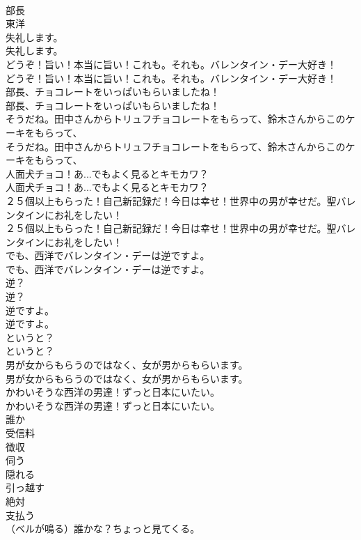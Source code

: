 \documentclass[8pt]{extreport}
\begin{document}
\begin{CJK}{UTF8}{min}
\\	部長
\\	東洋
\\	失礼します。	
\\	失礼します。 
\\	どうぞ！旨い！本当に旨い！これも。それも。バレンタイン・デー大好き！	
\\	どうぞ！旨い！本当に旨い！これも。それも。バレンタイン・デー大好き！ 
\\	部長、チョコレートをいっぱいもらいましたね！	
\\	部長、チョコレートをいっぱいもらいましたね！ 
\\	そうだね。田中さんからトリュフチョコレートをもらって、鈴木さんからこのケーキをもらって、	
\\	そうだね。田中さんからトリュフチョコレートをもらって、鈴木さんからこのケーキをもらって、 
\\	人面犬チョコ！あ...でもよく見るとキモカワ？	
\\	人面犬チョコ！あ...でもよく見るとキモカワ？ 
\\	２５個以上もらった！自己新記録だ！今日は幸せ！世界中の男が幸せだ。聖バレンタインにお礼をしたい！	
\\	２５個以上もらった！自己新記録だ！今日は幸せ！世界中の男が幸せだ。聖バレンタインにお礼をしたい！ 
\\	でも、西洋でバレンタイン・デーは逆ですよ。	
\\	でも、西洋でバレンタイン・デーは逆ですよ。 
\\	逆？	
\\	逆？ 
\\	逆ですよ。	
\\	逆ですよ。 
\\	というと？	
\\	というと？ 
\\	男が女からもらうのではなく、女が男からもらいます。	
\\	男が女からもらうのではなく、女が男からもらいます。 
\\	かわいそうな西洋の男達！ずっと日本にいたい。	
\\	かわいそうな西洋の男達！ずっと日本にいたい。 
\\	誰か
\\	受信料
\\	徴収
\\	伺う
\\	隠れる
\\	引っ越す
\\	絶対
\\	支払う
\\	（ベルが鳴る）誰かな？ちょっと見てくる。	

\end{CJK}
\end{document}
